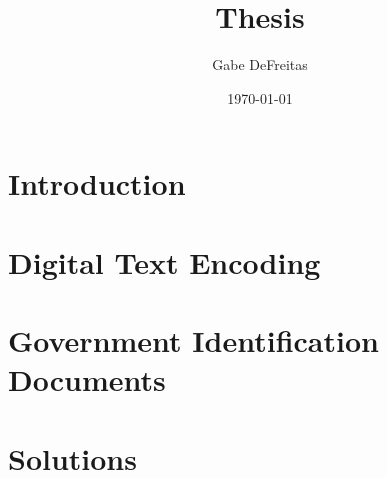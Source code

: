 \documentclass{report}
\title{Thesis}
\author{Gabe DeFreitas}
\date{\today}
\begin{document}
\maketitle
\tableofcontents

\chapter{Introduction}



\chapter{Digital Text Encoding}




\chapter{Government Identification Documents}





\chapter{Solutions}

\printbibliography
\end{document}
